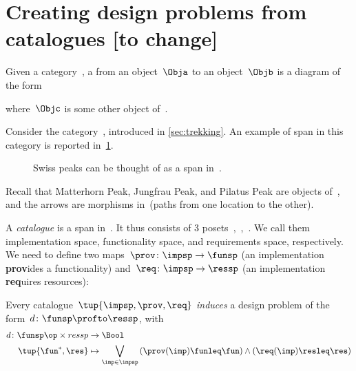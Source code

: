 

\section{Creating design problems from catalogues [to change]}
\label{sec:spans}

\begin{ctdefinition}[Span]
  \label{def:span}
  Given a category~\CatC, a \emph{} from an object~$\Obja$ to an object~$\Objb$ is a diagram of the form
  \begin{center}
  \end{center}
  where~$\Objc$ is some other object of~\CatC.
\end{ctdefinition}

\begin{example}
  Consider the category~\Berg, introduced in \cref{sec:trekking}. An example of span in this category is reported in~\cref{fig:exmountains}.
  \begin{figure}[h!]
    \begin{center}
    \end{center}
    \caption{Swiss peaks can be thought of as a span in~\Berg. \label{fig:exmountains}}
  \end{figure}
  Recall that \textsf{Matterhorn Peak}, \textsf{Jungfrau Peak}, and \textsf{Pilatus Peak} are objects of~\Berg, and the arrows are morphisms in~\Berg (paths from one location to the other).
\end{example}

\begin{definition}[Catalogue]
  \label{def:catalogue}
  A \emph{catalogue} is a span in~\Pos.
  It thus consists of 3 posets~\impsp,~\funsp,~\ressp.
  We call them implementation space, functionality space, and requirements space, respectively. We need to define two maps~$\prov \colon \impsp \to \funsp$ (an implementation \textbf{prov}ides a functionality) and~$\req\colon \impsp \to \ressp$ (an implementation \textbf{req}uires resources):
  \begin{center}
  \end{center}
\end{definition}

\begin{definition}
  Every catalogue~$\tup{\impsp,\prov,\req}$ \emph{induces} a design problem of the form~$d\colon \funsp \profto \ressp$, with
  \begin{equation*}
    \begin{aligned}
      d\colon \funsp \op \times ressp &\to \Bool\\
      \tup{\fun^*,\res}&\mapsto \bigvee_{\imp\in \impsp}\left(\prov(\imp)\funleq \fun \right)\wedge \left( \req(\imp)\resleq \res \right)
    \end{aligned}
  \end{equation*}
\end{definition}
